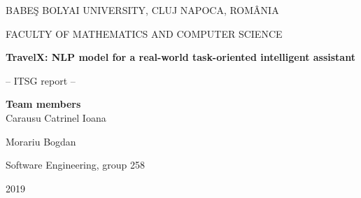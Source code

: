 \documentclass[runningheads,a4paper,11pt]{report}
\begin{document}
\begin{titlepage}
\sloppy
\begin{center}
BABE\c S BOLYAI UNIVERSITY, CLUJ NAPOCA, ROM\^ ANIA

FACULTY OF MATHEMATICS AND COMPUTER SCIENCE

\vspace{6cm}

\Huge \textbf{TravelX: NLP model for a real-world task-oriented intelligent assistant}

\vspace{1cm}

\normalsize -- ITSG report --

\end{center}


\vspace{5cm}

\begin{flushright}
\Large{\textbf{Team members}}\\
Carausu Catrinel Ioana

Morariu Bogdan

Software Engineering, group 258
\end{flushright}

\vspace{4cm}

\begin{center}
2019
\end{center}

\end{titlepage}


\begin{abstract}

	Natural Language Processing (NLP) has always been a challenging task in Artificial Intelligence, gaining increasing popularity due to new models emerging in the literature, that either solve new areas of the problem, or provide better solutions for algorithms already consecrated.
	
One such recently born model is Google\'s Bert (Bidirectional Encoder Representations from Transformers), that has created excitement in the field, by providing state-of-the-art results for a various number of NLP tasks. 

    In this paper we proposed a real-life use case that demonstrates the use and performance of the Bert model in Intent Classification, Slot Filling and Question Answering. Furthermore, these three models have been integrated to create an intelligent assistant able to suggest accommodations for tourists, based on some stated criteria. Once an accommodation has been suggested, our system provides capabilities to answer the user's questions about the given property.
    We used transfer learning to adapt and fine-tune pre-trained Bert models to our custom datasets, and were able to obtain results of 92.59\% for intent classification and slot filling, and of 90.14\% for question answering. 
\end{abstract}
\end{document}
